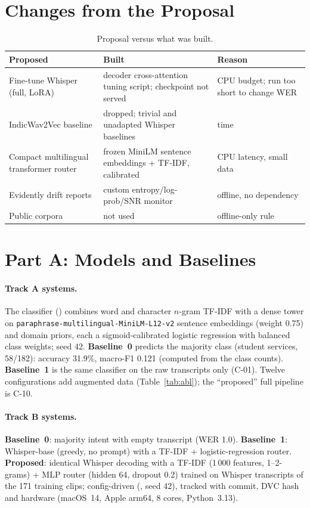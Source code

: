 \documentclass[sigconf,authordraft]{acmart}
\begin{document}
\section{Changes from the Proposal}\label{sec:changes}
\begin{table}[htbp]
\caption{Proposal versus what was built.}\label{tab:changes}
\begin{tabular}{p{2.0cm}p{2.3cm}p{2.8cm}}
\toprule Proposed & Built & Reason \\ \midrule
Fine-tune Whisper (full, LoRA) & decoder cross-attention tuning script; checkpoint not served & CPU budget; run too short to change WER \\
IndicWav2Vec baseline & dropped; trivial and unadapted Whisper baselines & time \\
Compact multilingual transformer router & frozen MiniLM sentence embeddings + TF-IDF, calibrated & CPU latency, small data \\
Evidently drift reports & custom entropy/log-prob/SNR monitor & offline, no dependency \\
Public corpora & not used & offline-only rule \\ \bottomrule
\end{tabular}
\end{table}

\section{Part A: Models and Baselines}\label{sec:models}
\paragraph{Track A systems.}
The classifier () combines word and character $n$-gram TF-IDF with a dense tower on \texttt{paraphrase-multilingual-MiniLM-L12-v2} sentence embeddings (weight 0.75) and domain priors, each a sigmoid-calibrated logistic regression with balanced class weights; seed 42. \textbf{Baseline~0} predicts the majority class (student services, 58/182): accuracy 31.9\%, macro-F1 0.121 (computed from the class counts). \textbf{Baseline~1} is the same classifier on the raw transcripts only (C-01). Twelve configurations add augmented data (Table~\ref{tab:abl}); the ``proposed'' full pipeline is C-10.
\paragraph{Track B systems.}
\textbf{Baseline~0}: majority intent with empty transcript (WER 1.0). \textbf{Baseline~1}: Whisper-base (greedy, no prompt) with a TF-IDF + logistic-regression router. \textbf{Proposed}: identical Whisper decoding with a TF-IDF (1\,000 features, 1--2-grams) + MLP router (hidden 64, dropout 0.2) trained on Whisper transcripts of the 171 training clips; config-driven (, seed 42), tracked with commit, DVC hash and hardware (macOS~14, Apple arm64, 8 cores, Python~3.13).
\end{document}
